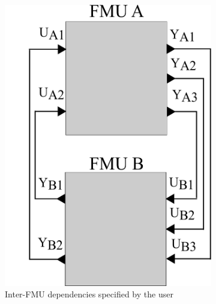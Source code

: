 \begin{figure}[htb]
\centering
\begin{subfigure}{.5\textwidth}
  \centering
  \includegraphics[scale=0.2]{figures/Two_Models_Black_Box}
  \caption{Inter-FMU dependencies specified by the user}
  \label{fig:2mdlsbb}
\end{subfigure}%
\begin{subfigure}{.5\textwidth}
  \centering

\end{subfigure}
\end{figure}

